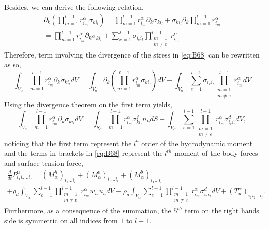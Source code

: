 Besides, we can derive the following relation,
\begin{multline*}
    \partial_k\left(\prod^{l-1}_{m=1}r^\alpha_{i_m}  \sigma_{ki_l}\right)
    = \prod^{l-1}_{m=1}r^\alpha_{i_m} \partial_k \sigma_{ki_l} 
    + \sigma_{ki_l} \partial_k \prod^{l-1}_{m=1}r^\alpha_{i_m}\\
    = \prod^{l-1}_{m=1}r^\alpha_{i_m} \partial_k \sigma_{ki_l} 
    + \sum^{l-1}_{e =1} \sigma_{i_ei_l} \prod^{l-1}_{\substack{m=1\\ m\neq e}}r^\alpha_{i_m}  
\end{multline*}
Therefore, term involving the divergence of the stress in \ref{eq:B68} can be rewritten as so, 
\begin{equation}
    \int_{V_\alpha} \prod^{l-1}_{m=1}r^\alpha_{i_m} \partial_k \sigma_{ki_l} dV
    =
    \int_{V_\alpha} \partial_k\left(\prod^{l-1}_{m=1}r^\alpha_{i_m}  \sigma_{ki_l}\right) dV 
    -\int_{V_\alpha} \sum^{l-1}_{e=1} \sigma_{i_ei_l}  \prod^{l-1}_{\substack{m=1\\ m\neq e}}r^\alpha_{i_m}  dV
\end{equation}
Using the divergence theorem on the first term yields,  
\begin{equation}
    \int_{V_\alpha} \prod^{l-1}_{m=1}r^\alpha_{i_m} \partial_k \sigma_{ki_l} dV
    =
    \int_{S_\alpha} \prod^{l-1}_{m=1}r^\alpha_{i_m}  \sigma_{ki_l}^fn_k dS 
    -\int_{V_\alpha} \sum^{l-1}_{e=1} \prod^{l-1}_{\substack{m=1\\ m\neq e}}r^\alpha_{i_m}  \sigma_{i_ei_l}^d dV,
\end{equation}
noticing that the first term represent the $l^h$ order of the hydrodynamic moment and the terms in brackets in \ref{eq:B68} represent the $l^{th}$ moment of the body forces and surface tension force,
\begin{multline}
    \frac{d}{dt}P_{i_1i_2\ldots i_l}^\alpha
    = 
    (M^h_\alpha)_{i_1\ldots i_l}
    +(M^\sigma_\alpha)_{i_1\ldots i_l}
    +(M^b_\alpha)_{i_1\ldots i_l}\\
    +\rho_d  \int_{V_\alpha} \sum_{e=1}^{l-1}  \prod^{l-1}_{\substack{ m=1 \\   m \neq e}} r^\alpha_{i_m} w_{i_e} u_{i_l}dV
    -\rho_d\int_{V_\alpha} \sum^{l-1}_{e=1} \prod^{l-1}_{\substack{m=1\\ m\neq e}}r^\alpha_{i_m}  \sigma_{i_ei_l}^d dV
    +(T_u^\alpha)_{i_1i_2\ldots i_l}.
    \label{eq:dt_P_order_l}
\end{multline}
Furthermore, as a consequence of the summation, the $5^{th}$ term on the right hands side is symmetric on all indices from $1$ to $l-1$.
